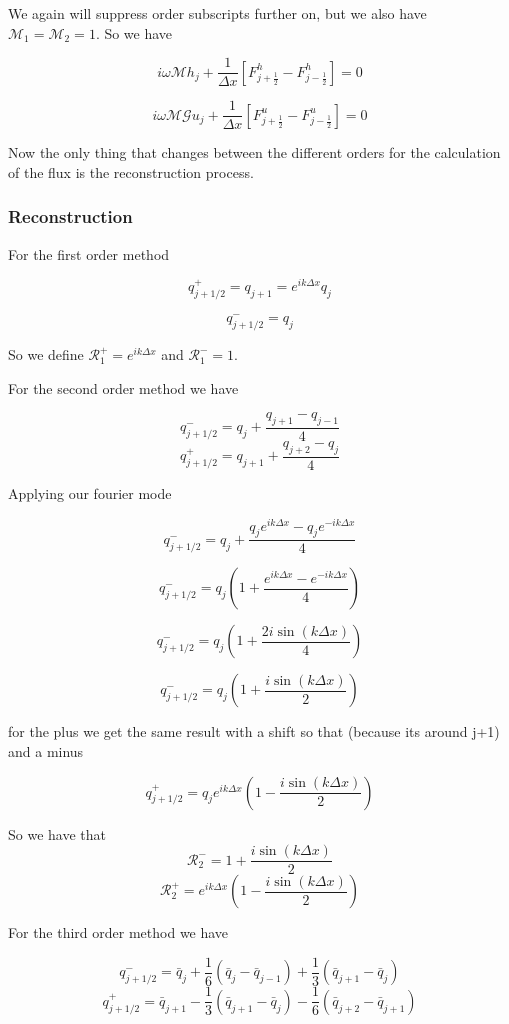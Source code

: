 \documentclass[12pt]{article}
\begin{document}
We again will suppress order subscripts further on, but we also have $\mathcal{M}_1 = \mathcal{M}_2 = 1$.
So we have 

\[i\omega \mathcal{M}h_j + \frac{1}{\Delta x}\left[F^h_{j + \frac{1}{2}} - F^h_{j - \frac{1}{2}}\right] = 0 \]

\[i\omega \mathcal{M} \mathcal{G}u_j + \frac{1}{\Delta x}\left[F^u_{j + \frac{1}{2}} - F^u_{j - \frac{1}{2}}\right] = 0 \]

Now the only thing that changes between the different orders for the calculation of the flux is the reconstruction process. 
\subsubsection{Reconstruction}

For the first order method

\[q^+_{j + 1/2} = q_{j+1} = e^{ik\Delta x} q_j\]

\[q^-_{j + 1/2} = q_{j}\]

So we define $\mathcal{R}^+_1 =  e^{ik\Delta x}$ and $\mathcal{R}^-_1 =  1$. 

For the second order method we have 

\[q^-_{j + 1/2} = q_j + \frac{q_{j+1} - q_{j-1}}{4}\]
\[q^+_{j + 1/2} = q_{j+1} + \frac{q_{j+2} - q_{j}}{4}\]

Applying our fourier mode

\[q^-_{j + 1/2} = q_j + \frac{q_{j}e^{ik\Delta x} - q_{j}e^{-ik\Delta x}}{4}\]

\[q^-_{j + 1/2} = q_j\left(1  + \frac{e^{ik\Delta x} - e^{-ik\Delta x}}{4} \right)\]

\[q^-_{j + 1/2} = q_j\left(1  + \frac{2i\sin\left(k\Delta x\right)}{4} \right)\]

\[q^-_{j + 1/2} = q_j\left(1  + \frac{i\sin\left(k\Delta x\right)}{2} \right)\]

for the plus we get the same result with a shift so that (because its around j+1) and a minus

\[q^+_{j + 1/2} = q_j e^{ik\Delta x}\left(1  - \frac{i\sin\left(k\Delta x\right)}{2} \right)\]

So we have that
\[\mathcal{R}_2^- = 1  + \frac{i\sin\left(k\Delta x\right)}{2}\]
\[\mathcal{R}_2^+ = e^{ik\Delta x}\left(1  - \frac{i\sin\left(k\Delta x\right)}{2} \right)\]

For the third order method we have 

\[q^-_{j + 1/2} = \bar{q}_j + \frac{1}{6}\left( \bar{q}_j - \bar{q}_{j-1}\right) + \frac{1}{3}\left( \bar{q}_{j+1} - \bar{q}_{j}\right)\]
\[q^+_{j + 1/2} = \bar{q}_{j+1} - \frac{1}{3}\left( \bar{q}_{j+1} - \bar{q}_{j}\right) - \frac{1}{6}\left( \bar{q}_{j+2} - \bar{q}_{j+1}\right)\]
\end{document}
